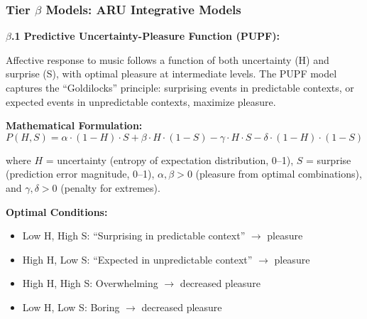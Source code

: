\documentclass[9pt,onecolumn]{article}
\begin{document}
\begin{center}
\end{center}

\subsubsection{Tier $\beta$ Models: ARU Integrative Models}

\textbf{$\beta$.1 Predictive Uncertainty-Pleasure Function (PUPF):}

Affective response to music follows a function of both uncertainty (H) and surprise (S), with optimal pleasure at intermediate levels. The PUPF model captures the ``Goldilocks'' principle: surprising events in predictable contexts, or expected events in unpredictable contexts, maximize pleasure.

\textbf{Mathematical Formulation:}
\begin{equation}
P(H, S) = \alpha \cdot (1-H) \cdot S + \beta \cdot H \cdot (1-S) - \gamma \cdot H \cdot S - \delta \cdot (1-H) \cdot (1-S)
\label{eq:pupf}
\end{equation}

where $H$ = uncertainty (entropy of expectation distribution, 0--1), $S$ = surprise (prediction error magnitude, 0--1), $\alpha, \beta > 0$ (pleasure from optimal combinations), and $\gamma, \delta > 0$ (penalty for extremes).

\textbf{Optimal Conditions:}
\begin{itemize}[leftmargin=*, topsep=0pt, itemsep=0pt]
\item Low H, High S: ``Surprising in predictable context'' $\rightarrow$ pleasure
\item High H, Low S: ``Expected in unpredictable context'' $\rightarrow$ pleasure
\item High H, High S: Overwhelming $\rightarrow$ decreased pleasure
\item Low H, Low S: Boring $\rightarrow$ decreased pleasure
\end{itemize}
\end{document}
